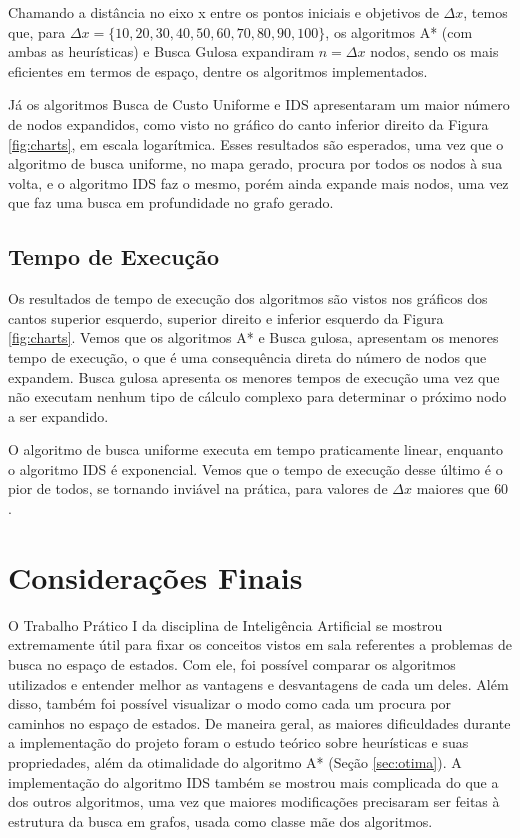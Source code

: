 \documentclass[12pt]{article}
\begin{document}
Chamando a distância no eixo x entre os pontos iniciais e objetivos de $ \Delta x $, temos que, para $ \Delta x = \{10, 20, 30, 40, 50, 60, 70, 80, 90, 100\} $, os algoritmos A* (com ambas as heurísticas) e Busca Gulosa expandiram $ n = \Delta x $ nodos, sendo os mais eficientes em termos de espaço, dentre os algoritmos implementados.

Já os algoritmos Busca de Custo Uniforme e IDS apresentaram um maior número de nodos expandidos, como visto no gráfico do canto inferior direito da Figura \ref{fig:charts}, em escala logarítmica.
Esses resultados são esperados, uma vez que o algoritmo de busca uniforme, no mapa gerado, procura por todos os nodos à sua volta, e o algoritmo IDS faz o mesmo, porém ainda expande mais nodos, uma vez que faz uma busca em profundidade no grafo gerado.

\subsection{Tempo de Execução} \label{sec:exptime}

Os resultados de tempo de execução dos algoritmos são vistos nos gráficos dos cantos superior esquerdo, superior direito e inferior esquerdo da Figura \ref{fig:charts}. Vemos que os algoritmos A* e Busca gulosa, apresentam os menores tempo de execução, o que é uma consequência direta do número de nodos que expandem. Busca gulosa apresenta os menores tempos de execução uma vez que não executam nenhum tipo de cálculo complexo para determinar o próximo nodo a ser expandido.

O algoritmo de busca uniforme executa em tempo praticamente linear, enquanto o algoritmo IDS é exponencial. Vemos que o tempo de execução desse último é o pior de todos, se tornando inviável na prática, para valores de $ \Delta x $ maiores que $ 60 $.

\section{Considerações Finais}

O Trabalho Prático I da disciplina de Inteligência Artificial se mostrou extremamente útil para fixar os conceitos vistos em sala referentes a problemas de busca no espaço de estados. Com ele, foi possível comparar os algoritmos utilizados e entender melhor as vantagens e desvantagens de cada um deles. Além disso, também foi possível visualizar o modo como cada um procura por caminhos no espaço de estados. De maneira geral, as maiores dificuldades durante a implementação do projeto foram o estudo teórico sobre heurísticas e suas propriedades, além da otimalidade do algoritmo A* (Seção \ref{sec:otima}). A implementação do algoritmo IDS também se mostrou mais complicada do que a dos outros algoritmos, uma vez que maiores modificações precisaram ser feitas à estrutura da busca em grafos, usada como classe mãe dos algoritmos.
\end{document}
